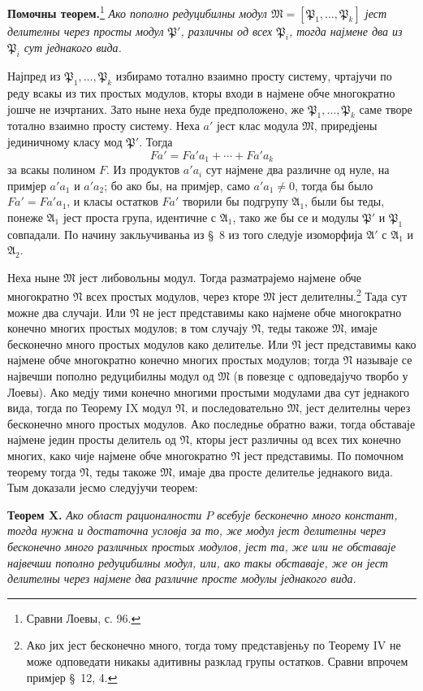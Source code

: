 ﻿\documentclass[11pt]{article}
\begin{document}
\textbf{Помочны теорем.}\footnote{Сравни Лоевы, с. 96.} \textit{Ако пополно редуцибилны модул \(\mathfrak M=[\mathfrak P_1,
\ldots,
\mathfrak P_k]\) јест делителны через просты модул \(\mathfrak P'\), различны од всех \(\mathfrak P_i\), тогда најмене два из \(\mathfrak P_i\) сут једнакого вида.}

Најпред из \(\mathfrak P_1,
\ldots,
\mathfrak P_k\) избирамо тотално взаимно просту систему, чртајучи по реду всакы из тих простых модулов, кторы входи в најмене обче многократно јошче не изчртаних. Зато ныне неха буде предположено, же \(\mathfrak P_1,
\ldots,
\mathfrak P_k\) саме творе тотално взаимно просту систему. Неха \(a'\) јест клас модула \(\mathfrak M\), приредјены јединичному класу мод \(\mathfrak P'\). Тогда
\[
 Fa'=Fa'a_1+\cdots+Fa'a_k
\]
за всакы полином \(F\). Из продуктов \(a'a_i\) сут најмене два различне од нуле, на примјер \(a'a_1\) и \(a'a_2\); бо ако бы, на примјер, само \(a'a_1\ne0\), тогда бы было \(Fa'=Fa'a_1\), и класы остатков \(Fa'\) творили бы подгрупу \(\mathfrak A_1\), были бы теды, понеже \(\mathfrak A_1\) јест проста група, идентичне с \(\mathfrak A_1\), тако же бы се и модулы \(\mathfrak P'\) и \(\mathfrak P_1\) совпадали. По начину закльучиваньа из \S~8 из того следује изоморфија \(\mathfrak A'\) с \(\mathfrak A_1\) и \(\mathfrak A_2\).

Неха ныне \(\mathfrak M\) јест либовольны модул. Тогда разматрајемо најмене обче многократно \(\mathfrak N\) всех простых модулов, через кторе \(\mathfrak M\) јест делителны.\footnote{Ако јих јест бесконечно много, тогда тому представјеньу по Теорему IV не може одповедати никакы адитивны разклад групы остатков. Сравни впрочем примјер \S~12, 4.} Тада сут можне два случаји. Или \(\mathfrak N\) не јест представимы како најмене обче многократно конечно многих простых модулов; в том случају \(\mathfrak N\), теды такоже \(\mathfrak M\), имаје бесконечно много простых модулов како делителье. Или \(\mathfrak N\) јест представимы како најмене обче многократно конечно многих простых модулов; тогда \(\mathfrak N\) называје се највечши пополно редуцибилны модул од \(\mathfrak M\) (в повезце с одповедајучо творбо у Лоевы). Ако медју тими конечно многими простыми модулами два сут једнакого вида, тогда по Теорему IX модул \(\mathfrak N\), и последовательно \(\mathfrak M\), јест делителны через бесконечно много простых модулов. Ако последнье обратно важи, тогда обставаје најмене једин просты делитель од \(\mathfrak N\), кторы јест различны од всех тих конечно многих, како чије најмене обче многократно \(\mathfrak N\) јест представимы. По помочном теорему тогда \(\mathfrak N\), теды такоже \(\mathfrak M\), имаје два просте делителье једнакого вида. Тым доказали јесмо следујучи теорем:

\textbf{Теорем X.} \textit{Ако област рационалности \(P\) всебује бесконечно много констант, тогда нужна и достаточна условја за то, же модул јест делителны через бесконечно много различных простых модулов, јест та, же или не обставаје највечши пополно редуцибилны модул, или, ако такы обставаје, же он јест делителны через најмене два различне просте модулы једнакого вида.}
\end{document}

